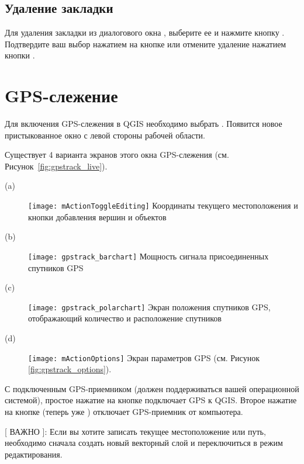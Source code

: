\subsection{Удаление закладки}
Для удаления закладки из диалогового окна ,
выберите ее и нажмите кнопку . Подтвердите ваш выбор
нажатием на кнопке  или отмените удаление нажатием кнопки
.

\section{GPS-слежение}\label{sec:gpstracking}

Для включения GPS-слежения в QGIS необходимо выбрать 
\arrow {}. Появится новое пристыкованное окно
с левой стороны рабочей области.

Существует 4 варианта экранов этого окна GPS-слежения
(см. Рисунок~\ref{fig:gpstrack_live}).

\begin{description}
 \item[(a)] \texttt{[image: mActionToggleEditing]}
 Координаты текущего местоположения и кнопки добавления вершин и объектов
 \item[(b)] \texttt{[image: gpstrack\_barchart]}
 Мощность сигнала присоединенных спутников GPS
 \item[(c)] \texttt{[image: gpstrack\_polarchart]}
 Экран положения спутников GPS, отображающий количество и расположение спутников
 \item[(d)] \texttt{[image: mActionOptions]}
 Экран параметров GPS (см. Рисунок \ref{fig:gpstrack_options}).
\end{description}

С подключенным GPS-приемником (должен поддерживаться вашей операционной
системой), простое нажатие на кнопке  подключает
GPS к QGIS. Второе нажатие на кнопке (теперь уже )
отключает GPS-приемник от компьютера.

[ ВАЖНО ]: Если вы хотите записать текущее местоположение или путь,
необходимо сначала создать новый векторный слой и переключиться в режим
редактирования.

\begin{figure}[ht]
\centering
     \hspace{0.33cm}
     \hspace{0.33cm}
    \\
\end{figure}

